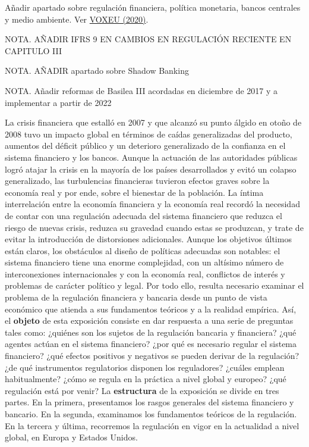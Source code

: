 \documentclass{nuevotema}
\begin{document}
\ideaclave

Añadir apartado sobre regulación financiera, política monetaria, bancos centrales y medio ambiente. Ver \href{https://voxeu.org/article/central-banks-and-climate-change}{VOXEU (2020)}.

NOTA. AÑADIR IFRS 9 EN CAMBIOS EN REGULACIÓN RECIENTE EN CAPITULO III

NOTA. AÑADIR apartado sobre Shadow Banking

NOTA. Añadir reformas de Basilea III acordadas en diciembre de 2017 y a implementar a partir de 2022

La crisis financiera que estalló en 2007 y que alcanzó su punto álgido en otoño de 2008 tuvo un impacto global en términos de caídas generalizadas del producto, aumentos del déficit público y un deterioro generalizado de la confianza en el sistema financiero y los bancos. Aunque la actuación de las autoridades públicas logró atajar la crisis en la mayoría de los países desarrollados y evitó un colapso generalizado, las turbulencias financieras tuvieron efectos graves sobre la economía real y por ende, sobre el bienestar de la población. La íntima interrelación entre la economía financiera y la economía real recordó la necesidad de contar con una regulación adecuada del sistema financiero que reduzca el riesgo de nuevas crisis, reduzca su gravedad cuando estas se produzcan, y trate de evitar la introducción de distorsiones adicionales. Aunque los objetivos últimos están claros, los obstáculos al diseño de políticas adecuadas son notables: el sistema financiero tiene una enorme complejidad, con un altísimo número de interconexiones internacionales y con la economía real, conflictos de interés y problemas de carácter político y legal. Por todo ello, resulta necesario examinar el problema de la regulación financiera y bancaria desde un punto de vista económico que atienda a sus fundamentos teóricos y a la realidad empírica. Así, el \textbf{objeto} de esta exposición consiste en dar respuesta a una serie de preguntas tales como: ¿quiénes son los sujetos de la regulación bancaria y financiera? ¿qué agentes actúan en el sistema financiero? ¿por qué es necesario regular el sistema financiero? ¿qué efectos positivos y negativos se pueden derivar de la regulación? ¿de qué instrumentos regulatorios disponen los reguladores? ¿cuáles emplean habitualmente? ¿cómo se regula en la práctica a nivel global y europeo? ¿qué regulación está por venir? La \textbf{estructura} de la exposición se divide en tres partes. En la primera, presentamos los rasgos generales del sistema financiero y bancario. En la segunda, examinamos los fundamentos teóricos de la regulación. En la tercera y última, recorremos la regulación en vigor en la actualidad a nivel global, en Europa y Estados Unidos.
\end{document}
